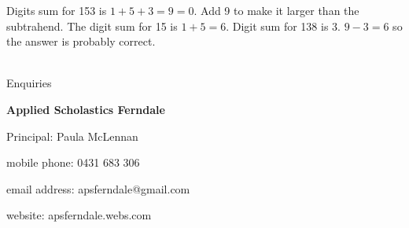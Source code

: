 \documentclass{article}
\begin{document}
Digits sum for 153 is $1+5+3 = 9 = 0$. Add 9 to make it larger than the subtrahend. The digit sum for 15 is $1 + 5 = 6$. Digit sum for 138 is 3. $9 - 3 = 6$ so the answer is probably correct.\\

\newpage
\

\begin{center}
\linespread{2}\large

Enquiries

\textbf{Applied Scholastics Ferndale}

Principal: Paula McLennan

mobile phone: 0431 683 306

email address: apsferndale@gmail.com

website: apsferndale.webs.com
\end{center}
\end{document}
